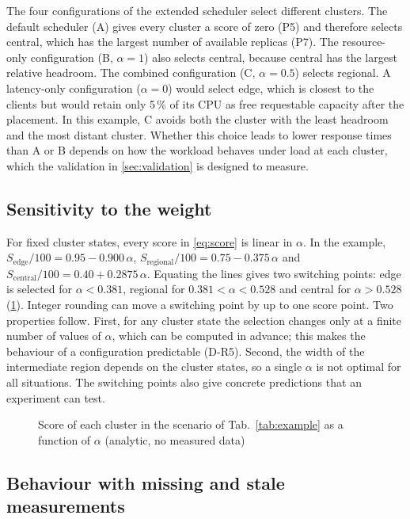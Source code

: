 The four configurations of the extended scheduler select different clusters. The default scheduler (A) gives every cluster a score of zero (P5) and therefore selects central, which has the largest number of available replicas (P7). The resource-only configuration (B, $\alpha = 1$) also selects central, because central has the largest relative headroom. The combined configuration (C, $\alpha = 0.5$) selects regional. A latency-only configuration ($\alpha = 0$) would select edge, which is closest to the clients but would retain only 5\,\% of its CPU as free requestable capacity after the placement. In this example, C avoids both the cluster with the least headroom and the most distant cluster. Whether this choice leads to lower response times than A or B depends on how the workload behaves under load at each cluster, which the validation in \cref{sec:validation} is designed to measure.

\subsection{Sensitivity to the weight}\label{sec:analysis-weight}

For fixed cluster states, every score in \cref{eq:score} is linear in $\alpha$. In the example, $S_{\mathrm{edge}}/100 = 0.95 - 0.900\,\alpha$, $S_{\mathrm{regional}}/100 = 0.75 - 0.375\,\alpha$ and $S_{\mathrm{central}}/100 = 0.40 + 0.2875\,\alpha$. Equating the lines gives two switching points: edge is selected for $\alpha < 0.381$, regional for $0.381 < \alpha < 0.528$ and central for $\alpha > 0.528$ (\cref{fig:regions}). Integer rounding can move a switching point by up to one score point. Two properties follow. First, for any cluster state the selection changes only at a finite number of values of $\alpha$, which can be computed in advance; this makes the behaviour of a configuration predictable (D-R5). Second, the width of the intermediate region depends on the cluster states, so a single $\alpha$ is not optimal for all situations. The switching points also give concrete predictions that an experiment can test.

\begin{figure}[t]
\centering

\caption{Score of each cluster in the scenario of Tab.~\ref*{tab:example} as a function of $\alpha$ (analytic, no measured data)}\label{fig:regions}
\end{figure}

\subsection{Behaviour with missing and stale measurements}\label{sec:analysis-missing}

